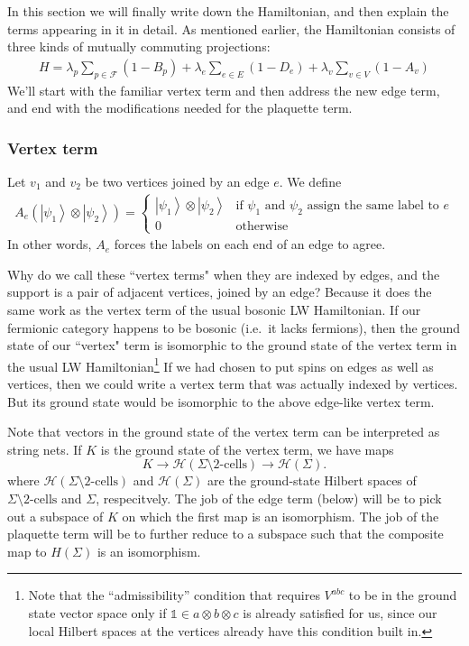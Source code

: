 \documentclass[12pt,a4paper]{article}
\newcommand{\tp}{\otimes}
\newcommand{\unit}{\mathds{1}}
\newcommand{\mch}{\mathcal{H}}
\newcommand\be            {\begin{equation}}
\newcommand\ee            {\end{equation}}
\newcommand{\ket}[1]{\ensuremath{\left|#1\right\rangle}}
\begin{document}
In this section we will finally write down the Hamiltonian, and then explain the terms appearing in it in detail. 
As mentioned earlier, the Hamiltonian consists of three kinds of mutually commuting projections:
\begin{align}
H = \lambda_p \sum_{p \in \mathcal{F}} (1-B_p)  + \lambda_e \sum_{e \in E} (1-D_e) + \lambda_v \sum_{v \in V} (1-A_v)
\end{align}
We'll start with the familiar vertex term and then address the new edge term, 
and end with the modifications needed for the plaquette term.




\subsubsection{Vertex term}   \label{VertexHamiltonian}

Let $v_1$ and $v_2$ be two vertices joined by an edge $e$.
We define
\begin{align}
A_e(\ket{\psi_1} \otimes \ket{\psi_2}) = 
\left\{
                \begin{array}{ll}
                   \ket{\psi_1} \otimes \ket{\psi_2} & \text{if $\psi_1$ and $\psi_2$ assign the same label to $e$} \\
                  0 & \text{otherwise}
                \end{array}
              \right.
\end{align}
In other words, $A_e$ forces the labels on each end of an edge to agree.

Why do we call these ``vertex terms" when they are indexed by edges, and the support is a pair of adjacent vertices, joined by an edge?
Because it does the same work as the vertex term of the usual bosonic LW Hamiltonian.
If our fermionic category happens to be bosonic (i.e.\ it lacks fermions), then the ground state of our ``vertex" term is isomorphic to the ground state
of the vertex term in the usual LW Hamiltonian\footnote{Note that the ``admissibility'' condition that requires $V^{abc}$ to be in the ground state vector space only if $\unit\in a\tp b \tp c$ is already satisfied for us, since our local Hilbert spaces at the vertices already have this condition built in.}
If we had chosen to put spins on edges as well as vertices, then we could write a vertex term that was actually indexed by vertices.
But its ground state would be isomorphic to the above edge-like vertex term.

Note that vectors in the ground state of the vertex term can be interpreted as string nets.
If $K$ is the ground state of the vertex term, we have maps
\be
	K \to \mch(\Sigma \setminus \mbox{2-cells}) \to \mch(\Sigma) .
	\label{ground_state_projection}
\ee
where $\mch(\Sigma \setminus \mbox{2-cells})$ and $\mch(\Sigma)$ are the ground-state Hilbert spaces of $\Sigma \setminus \mbox{2-cells}$ and $\Sigma$, respecitvely.
The job of the edge term (below) will be to pick out a subspace of $K$ on which the first map is an isomorphism. 
The job of the plaquette term will be to further reduce to a subspace such that the composite map to $H(\Sigma)$ is an isomorphism.
\end{document}
